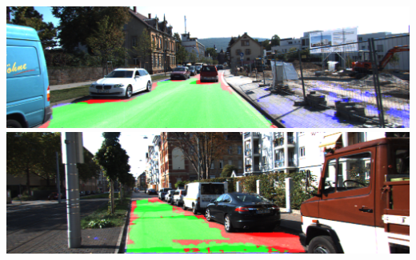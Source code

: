 \includegraphics[scale=0.2]{figures/kitty_eval/Persp_uu_road_000027.png}
\includegraphics[scale=0.2]{figures/kitty_eval/Persp_uu_road_000082.png}



